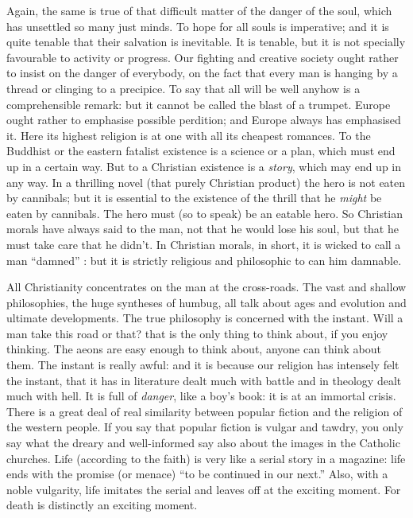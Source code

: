 \documentclass{book}
\begin{document}
Again, the same is true of that difficult matter of the danger of the soul, which has unsettled so many just minds. To hope for all souls is imperative; and it is quite tenable that their salvation is inevitable. It is tenable, but it is not specially favourable to activity or progress. Our fighting and creative society ought rather to insist on the danger of everybody, on the fact that every man is hanging by a thread or clinging to a precipice. To say that all will be well anyhow is a comprehensible remark: but it cannot be called the blast of a trumpet. Europe ought rather to emphasise possible perdition; and Europe always has emphasised it. Here its highest religion is at one with all its cheapest romances. To the Buddhist or the eastern fatalist existence is a science or a plan, which must end up in a certain way. But to a Christian existence is a \emph{story}, which may end up in any way. In a thrilling novel (that purely Christian product) the hero is not eaten by cannibals; but it is essential to the existence of the thrill that he \emph{might} be eaten by cannibals. The hero must (so to speak) be an eatable hero. So Christian morals have always said to the man, not that he would lose his soul, but that he must take care that he didn’t. In Christian morals, in short, it is wicked to call a man “damned” : but it is strictly religious and philosophic to can him damnable.

All Christianity concentrates on the man at the cross-roads. The vast and shallow philosophies, the huge syntheses of humbug, all talk about ages and evolution and ultimate developments. The true philosophy is concerned with the instant. Will a man take this road or that? that is the only thing to think about, if you enjoy thinking. The aeons are easy enough to think about, anyone can think about them. The instant is really awful: and it is because our religion has intensely felt the instant, that it has in literature dealt much with battle and in theology dealt much with hell. It is full of \emph{danger}, like a boy’s book: it is at an immortal crisis. There is a great deal of real similarity between popular fiction and the religion of the western people. If you say that popular fiction is vulgar and tawdry, you only say what the dreary and well-informed say also about the images in the Catholic churches. Life (according to the faith) is very like a serial story in a magazine: life ends with the promise (or menace) “to be continued in our next.” Also, with a noble vulgarity, life imitates the serial and leaves off at the exciting moment. For death is distinctly an exciting moment.
\end{document}
